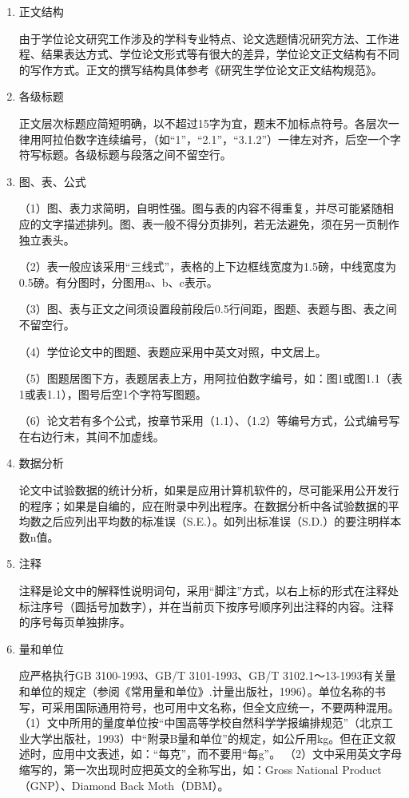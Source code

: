 \begin{enumerate}

    \item 正文结构
    
    由于学位论文研究工作涉及的学科专业特点、论文选题情况研究方法、工作进程、结果表达方式、学位论文形式等有很大的差异，学位论文正文结构有不同的写作方式。正文的撰写结构具体参考《研究生学位论文正文结构规范》。

    \item 各级标题
    
    正文层次标题应简短明确，以不超过15字为宜，题末不加标点符号。各层次一律用阿拉伯数字连续编号，（如“1”，“2.1”，“3.1.2”）一律左对齐，后空一个字符写标题。各级标题与段落之间不留空行。
    
    \item 图、表、公式
    
    （1）图、表力求简明，自明性强。图与表的内容不得重复，并尽可能紧随相应的文字描述排列。图、表一般不得分页排列，若无法避免，须在另一页制作独立表头。
    
    （2）表一般应该采用“三线式”，表格的上下边框线宽度为1.5磅，中线宽度为0.5磅。有分图时，分图用a、b、c表示。
    
    （3）图、表与正文之间须设置段前段后0.5行间距，图题、表题与图、表之间不留空行。
    
    （4）学位论文中的图题、表题应采用中英文对照，中文居上。
    
    （5）图题居图下方，表题居表上方，用阿拉伯数字编号，如：图1或图1.1（表1或表1.1），图号后空1个字符写图题。
    
    （6）论文若有多个公式，按章节采用（1.1）、（1.2）等编号方式，公式编号写在右边行末，其间不加虚线。
    
    \item 数据分析
    
    论文中试验数据的统计分析，如果是应用计算机软件的，尽可能采用公开发行的程序；如果是自编的，应在附录中列出程序。在数据分析中各试验数据的平均数之后应列出平均数的标准误（S.E.）。如列出标准误（S.D.）的要注明样本数n值。
    
    \item 注释
    
    注释是论文中的解释性说明词句，采用“脚注”方式，以右上标的形式在注释处标注序号（圆括号加数字），并在当前页下按序号顺序列出注释的内容。注释的序号每页单独排序。
    
    \item 量和单位
    
    应严格执行GB 3100-1993、GB/T 3101-1993、GB/T 3102.1～13-1993有关量和单位的规定（参阅《常用量和单位》.计量出版社，1996）。单位名称的书写，可采用国际通用符号，也可用中文名称，但全文应统一，不要两种混用。
    （1）文中所用的量度单位按“中国高等学校自然科学学报编排规范”（北京工业大学出版社，1993）中“附录B量和单位”的规定，如公斤用kg。但在正文叙述时，应用中文表述，如：“每克”，而不要用“每g”。
    （2）文中采用英文字母缩写的，第一次出现时应把英文的全称写出，如：Gross National Product（GNP）、Diamond Back Moth（DBM）。

\end{enumerate}

